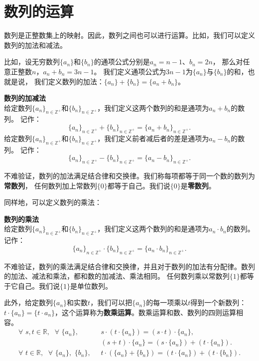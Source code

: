 \documentclass[12pt,UTF8]{ctexbook}
\begin{document}
\section{数列的运算}

数列是正整数集上的映射。因此，数列之间也可以进行运算。比如，我们可以定义数列的加法和减法。

比如，设无穷数列$\{a_n\}$和$\{b_n\}$的通项公式分别是$a_n = n - 1$、$b_n = 2n$，
那么对任意正整数$n$，$a_n + b_n = 3n - 1$。
我们定义通项公式为$3n - 1$为$\{a_n\}$与$\{b_n\}$的和，也就是说，
我们定义数列的加法：$\{a_n\} + \{b_n\} = \{a_n + b_n\}$。

\begin{df}\textbf{数列的加减法}\\
    给定数列$\{a_n\}_{n\in\mathbb{Z}^+}$和$\{b_n\}_{n\in\mathbb{Z}^+}$，我们定义这两个数列的和是通项为$a_n + b_n$的数列。
    记作：
    $$ \{a_n\}_{n\in\mathbb{Z}^+} + \{b_n\}_{n\in\mathbb{Z}^+} = \{a_n + b_n\}_{n\in\mathbb{Z}^+}.$$
    给定数列$\{a_n\}_{n\in\mathbb{Z}^+}$和$\{b_n\}_{n\in\mathbb{Z}^+}$，我们定义前者减后者的差是通项为$a_n - b_n$的数列。
    记作：
    $$ \{a_n\}_{n\in\mathbb{Z}^+} - \{b_n\}_{n\in\mathbb{Z}^+} = \{a_n - b_n\}_{n\in\mathbb{Z}^+}.$$    
\end{df}

不难验证，数列的加法满足结合律和交换律。我们称每项都等于同一个数的数列为\textbf{常数列}，
任何数列加上常数列$\{0\}$都等于自己。我们说$\{0\}$是\textbf{零数列}。

同样地，可以定义数列的乘法：
\begin{df}\textbf{数列的乘法}\\
    给定数列$\{a_n\}_{n\in\mathbb{Z}^+}$和$\{b_n\}_{n\in\mathbb{Z}^+}$，我们定义这两个数列的和是通项为$a_n \cdot b_n$的数列。
    记作：
    $$ \{a_n\}_{n\in\mathbb{Z}^+} \cdot \{b_n\}_{n\in\mathbb{Z}^+} = \{a_n \cdot b_n\}_{n\in\mathbb{Z}^+}.$$    
\end{df}

不难验证，数列的乘法满足结合律和交换律，并且对于数列的加法有分配律。数列的加法、减法和乘法，都和数的加减法、乘法相同。
任何数列乘以常数列$\{1\}$都等于它自己。我们说$\{1\}$是单位数列。

此外，给定数列$\{a_n\}$和实数$t$，我们可以把$\{a_n\}$的每一项乘以$t$得到一个新数列：
$t\cdot \{a_n\} = \{t\cdot a_n\}$，这个运算称为\textbf{数乘运算}。数乘运算和数、数列的四则运算相容。
\begin{align*}
    \forall  \,\, s, t \in \mathbb{R}, \;\,\, \forall \,\, \{a_n\}, \;\,\,& s \cdot (t\cdot \{a_n\}) = (s\cdot t)\cdot \{a_n\},  \\
    & (s + t) \cdot \{a_n\} = (s\cdot \{a_n\}) + (t\cdot \{a_n\}).  \\
    \forall  \,\, t \in \mathbb{R}, \;\,\, \forall \,\, \{a_n\}, \,\, \{b_n\},\;\,\, & t \cdot (\{a_n\} + \{b_n\}) = (t \cdot \{a_n\}) + (t \cdot \{b_n\}).  
\end{align*}
\end{document}
